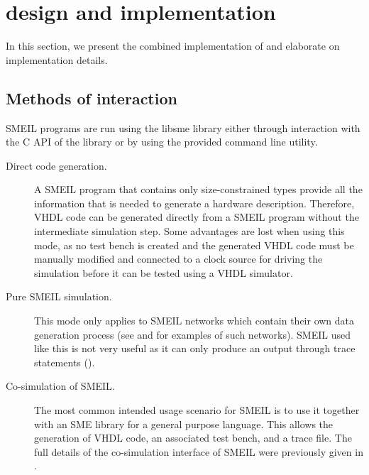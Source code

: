 \chapter{\libsme{} design and implementation}

In this section, we present the combined implementation of \libsme{} and
elaborate on implementation details.

\section{Methods of interaction}
\label{sec:using}
SMEIL programs are run using the {\ttfamily libsme} library either through interaction
with the C API of the library or by using the provided command line utility.

\begin{description}
\item[Direct code generation.]
  A SMEIL program that contains only size-constrained types provide all the
  information that is needed to generate a hardware description. Therefore, VHDL
  code can be generated directly from a SMEIL program without the intermediate
  simulation step. Some advantages are lost when using this mode, as no test
  bench is created and the generated VHDL code must be manually modified and
  connected to a clock source for driving the simulation before it can be tested
  using a VHDL simulator.
\item[Pure SMEIL simulation.] This mode only applies to SMEIL networks which
  contain their own data generation process (see  and
   for examples of such networks). SMEIL used like this is not
  very useful as it can only produce an output through {\ttfamily trace}
  statements ().
\item[Co-simulation of SMEIL.] The most common intended usage scenario for SMEIL
  is to use it together with an SME library for a general purpose language. This
  allows the generation of VHDL code, an associated test bench, and a trace
  file. The full details of the co-simulation interface of SMEIL were previously
  given in .
\end{description}

